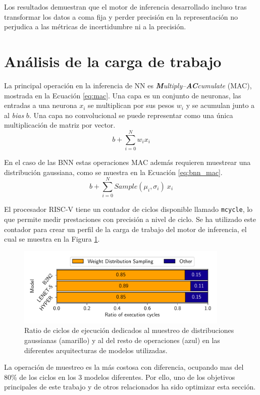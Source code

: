 Los resultados demuestran que el motor de inferencia desarrollado incluso tras transformar los datos a coma fija y perder precisión en la representación no perjudica a las métricas de incertidumbre ni a la precisión.

\section{Análisis de la carga de trabajo}

La principal operación en la inferencia de NN es \textit{\textbf{M}ultiply–\textbf{AC}cumulate} (MAC), mostrada en la Ecuación \ref{eq:mac}. Una capa es un conjunto de neuronas, las entradas a una neurona $x_i$ se multiplican por sus pesos $w_i$ y se acumulan junto a al \textit{bias} $b$. Una capa no convolucional se puede representar como una única multiplicación de matriz por vector.
\begin{equation} \label{eq:mac}
b + \sum_{i=0}^N w_i x_i
\end{equation}

En el caso de las BNN estas operaciones MAC además requieren muestrear una distribución gaussiana, como se muestra en la Ecuación \ref{eq:bnn_mac}.
\begin{equation} \label{eq:bnn_mac}
b + \sum_{i=0}^N Sample(\mu_i, \sigma_i)\ x_i
\end{equation}

El procesador RISC-V tiene un contador de ciclos disponible llamado \texttt{mcycle}, lo que permite medir prestaciones con precisión a nivel de ciclo. Se ha utilizado este contador para crear un perfil de la carga de trabajo del motor de inferencia, el cual se muestra en la Figura \ref{fig:cycle_profile}.

\begin{figure}[h]
    \centering
    \includegraphics[width=0.9\textwidth]{root/Imagenes/4_bnn_riscv/cycles.pdf}
    \caption{Ratio de ciclos de ejecución dedicados al muestreo de distribuciones gaussianas (amarillo) y al del resto de operaciones (azul) en las diferentes arquitecturas de modelos utilizadas.}
    \label{fig:cycle_profile}
\end{figure}

La operación de muestreo es la más costosa con diferencia, ocupando mas del 80\% de los ciclos en los 3 modelos diferentes. Por ello, uno de los objetivos principales de este trabajo y de otros relacionados ha sido optimizar esta sección.